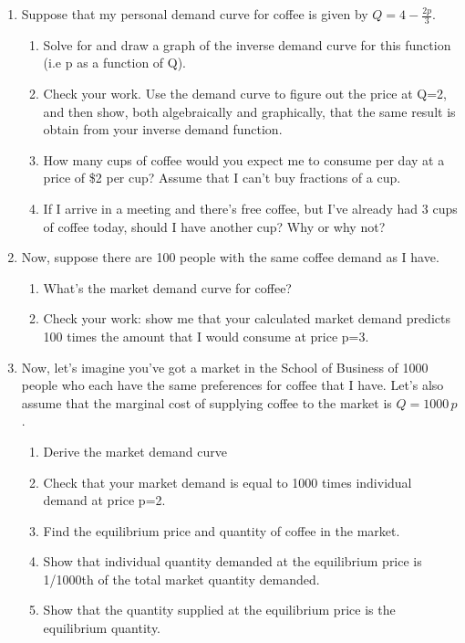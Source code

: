 \documentclass[11pt,]{article}
\providecommand{\tightlist}{%
  \setlength{\itemsep}{0pt}\setlength{\parskip}{0pt}}
\begin{document}
\begin{enumerate}
\def\labelenumi{\arabic{enumi}.}
\item
  Suppose that my personal demand curve for coffee is given by
  \(Q=4-\frac{2p}{3}\).

  \begin{enumerate}
  \def\labelenumii{\alph{enumii})}
  \item
    Solve for and draw a graph of the inverse demand curve for this
    function (i.e p as a function of Q).
  \item
    Check your work. Use the demand curve to figure out the price at
    Q=2, and then show, both algebraically and graphically, that the
    same result is obtain from your inverse demand function.
  \item
    How many cups of coffee would you expect me to consume per day at a
    price of \$2 per cup? Assume that I can't buy fractions of a cup.
  \item
    If I arrive in a meeting and there's free coffee, but I've already
    had 3 cups of coffee today, should I have another cup? Why or why
    not?
  \end{enumerate}
\item
  Now, suppose there are 100 people with the same coffee demand as I
  have.

  \begin{enumerate}
  \def\labelenumii{\alph{enumii})}
  \tightlist
  \item
    What's the market demand curve for coffee?
  \item
    Check your work: show me that your calculated market demand predicts
    100 times the amount that I would consume at price p=3.
  \end{enumerate}
\item
  Now, let's imagine you've got a market in the School of Business of
  1000 people who each have the same preferences for coffee that I have.
  Let's also assume that the marginal cost of supplying coffee to the
  market is \(Q=1000\,p\).

  \begin{enumerate}
  \def\labelenumii{\alph{enumii})}
  \tightlist
  \item
    Derive the market demand curve
  \item
    Check that your market demand is equal to 1000 times individual
    demand at price p=2.
  \item
    Find the equilibrium price and quantity of coffee in the market.
  \item
    Show that individual quantity demanded at the equilibrium price is
    1/1000th of the total market quantity demanded.
  \item
    Show that the quantity supplied at the equilibrium price is the
    equilibrium quantity.
  \end{enumerate}
\end{enumerate}
\end{document}

